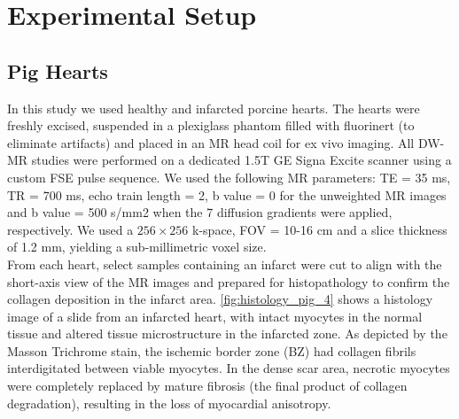 \chapter{Experimental Setup}

\section{Pig Hearts}

In this study we used healthy and infarcted porcine hearts. The hearts were freshly excised, suspended in a plexiglass phantom filled with fluorinert (to eliminate artifacts) and placed in an MR head coil for ex vivo imaging. All DW-MR studies were performed on a dedicated 1.5T GE Signa Excite scanner using a custom FSE pulse sequence. We used the following MR parameters: TE = 35 ms, TR = 700 ms, echo train length = 2, b value = 0 for the unweighted MR images and b value = 500 s/mm2 when the 7 diffusion gradients were applied, respectively. We used a $256 \times 256$ k-space, FOV = 10-16 cm and a slice thickness of 1.2 mm, yielding a sub-millimetric voxel size. \\
From each heart, select samples containing an infarct were cut to align with the short-axis view of the MR images and prepared for histopathology to confirm the collagen deposition in the infarct area. \ref{fig:histology_pig_4} shows a histology image of a slide from an infarcted heart, with intact myocytes in the normal tissue and altered tissue microstructure in the infarcted zone. As depicted by the Masson Trichrome stain, the ischemic border zone (BZ) had collagen fibrils interdigitated between viable myocytes. In the dense scar area, necrotic myocytes were completely replaced by mature fibrosis (the final product of collagen degradation), resulting in the loss of myocardial anisotropy.\\\\\\

